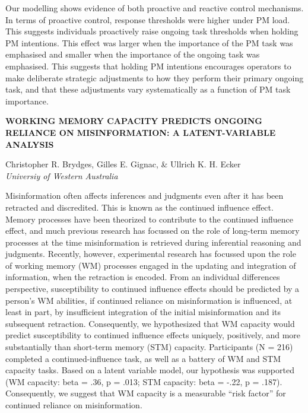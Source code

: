 \documentclass[]{article}
\begin{document}
Our modelling shows evidence of both proactive and reactive control
mechanisms. In terms of proactive control, response thresholds were
higher under PM load. This suggests individuals proactively raise
ongoing task thresholds when holding PM intentions. This effect was
larger when the importance of the PM task was emphasised and smaller
when the importance of the ongoing task was emphasised. This suggests
that holding PM intentions encourages operators to make deliberate
strategic adjustments to how they perform their primary ongoing task,
and that these adjustments vary systematically as a function of PM task
importance.\\
\pagebreak  

\textbf{WORKING MEMORY CAPACITY PREDICTS ONGOING RELIANCE ON
MISINFORMATION: A LATENT-VARIABLE ANALYSIS}

Christopher R. Brydges, Gilles E. Gignac, \& Ullrich K. H. Ecker\\
\emph{Universiy of Western Australia}

Misinformation often affects inferences and judgments even after it has
been retracted and discredited. This is known as the continued influence
effect. Memory processes have been theorized to contribute to the
continued influence effect, and much previous research has focussed on
the role of long-term memory processes at the time misinformation is
retrieved during inferential reasoning and judgments. Recently, however,
experimental research has focussed upon the role of working memory (WM)
processes engaged in the updating and integration of information, when
the retraction is encoded. From an individual differences perspective,
susceptibility to continued influence effects should be predicted by a
person's WM abilities, if continued reliance on misinformation is
influenced, at least in part, by insufficient integration of the initial
misinformation and its subsequent retraction. Consequently, we
hypothesized that WM capacity would predict susceptibility to continued
influence effects uniquely, positively, and more substantially than
short-term memory (STM) capacity. Participants (N = 216) completed a
continued-influence task, as well as a battery of WM and STM capacity
tasks. Based on a latent variable model, our hypothesis was supported
(WM capacity: beta = .36, p = .013; STM capacity: beta = -.22, p =
.187). Consequently, we suggest that WM capacity is a measurable ``risk
factor'' for continued reliance on misinformation.\\
\pagebreak  
\end{document}
